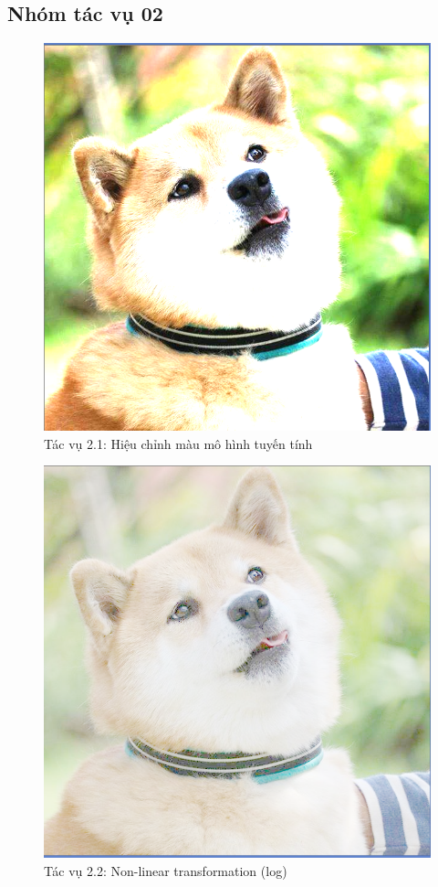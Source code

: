 \documentclass{article}
\begin{document}
	\subsection{Nhóm tác vụ 02}
	\begin{figure}[H]
		\centering
		\includegraphics[scale = 0.4]{21linear}
		\caption{Tác vụ 2.1: Hiệu chỉnh màu mô hình tuyến tính}
	\end{figure}
	\begin{figure}[H]
		\centering
		\includegraphics[scale = 0.4]{22log}
		\caption{Tác vụ 2.2: Non-linear transformation (log)}
	\end{figure}
\end{document}
